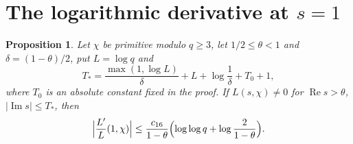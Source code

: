 \documentclass[11pt,a4paper,reqno]{amsart}
\newtheorem{proposition}[theorem]{Proposition}
\theoremstyle{remark}
\numberwithin{equation}{section}
\renewcommand{\Re}{\operatorname{Re}}
\renewcommand{\Im}{\operatorname{Im}}
\begin{document}
\section{The logarithmic derivative at \texorpdfstring{$s=1$}{s=1}}\label{sec:logder}

\begin{proposition}\label{prop:logder}
Let $\chi$ be primitive modulo $q\ge3$, let $1/2\le\theta<1$ and $\delta=(1-\theta)/2$, put $L=\log q$ and
\[
  T_*=\frac{\max(1,\log L)}\delta+L+\log\frac1\delta+T_0+1,
\]
where $T_0$ is an absolute constant fixed in the proof. If $L(s,\chi)\ne0$ for $\Re s>\theta$, $|\Im s|\le T_*$, then
\[
  \Bigl|\frac{L'}{L}(1,\chi)\Bigr|\le\frac{c_{16}}{1-\theta}\Bigl(\log\log q+\log\frac2{1-\theta}\Bigr).
\]
\end{proposition}
\end{document}
